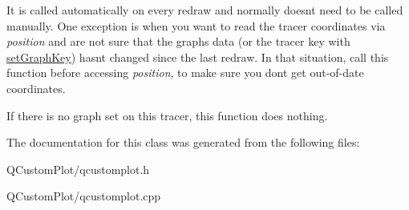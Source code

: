 It is called automatically on every redraw and normally doesn\textquotesingle{}t need to be called manually. One exception is when you want to read the tracer coordinates via {\itshape position} and are not sure that the graph\textquotesingle{}s data (or the tracer key with \mbox{\hyperlink{class_q_c_p_item_tracer_a6840143b42f3b685cedf7c6d83a704c8}{set\+Graph\+Key}}) hasn\textquotesingle{}t changed since the last redraw. In that situation, call this function before accessing {\itshape position}, to make sure you don\textquotesingle{}t get out-\/of-\/date coordinates.

If there is no graph set on this tracer, this function does nothing. 

The documentation for this class was generated from the following files\+:\begin{DoxyCompactItemize}
\item 
Q\+Custom\+Plot/qcustomplot.\+h\item 
Q\+Custom\+Plot/qcustomplot.\+cpp\end{DoxyCompactItemize}
